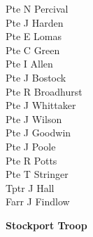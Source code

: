 \begin{multicols}{2}
  Pte N Percival \\
  Pte J Harden \\
  Pte E Lomas \\
  Pte C Green \\
  Pte I Allen \\
  Pte J Bostock \\
  Pte R Broadhurst \\
  Pte J Whittaker \\
  Pte J Wilson \\
  Pte J Goodwin \\
  Pte J Poole \\
  Pte R Potts \\
  Pte T Stringer \\
  Tptr J Hall \\
  Farr J Findlow \\
\end{multicols}

\vspace*{10mm}

\pagebreak

\begin{center}
  \Large
  \textbf{Stockport Troop}
\end{center}

\vspace*{10mm}

